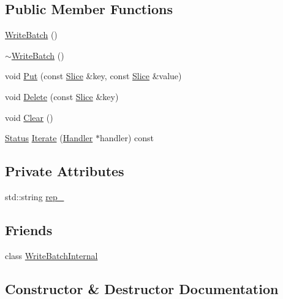 \subsection*{Public Member Functions}
\begin{DoxyCompactItemize}
\item 
\hyperlink{classleveldb_1_1_write_batch_a5287eda973cfd100149a034c871dcc44}{Write\+Batch} ()
\item 
\hyperlink{classleveldb_1_1_write_batch_a5bc7decc31279f2457839b30ad8daca5}{$\sim$\+Write\+Batch} ()
\item 
void \hyperlink{classleveldb_1_1_write_batch_a30770379143a7ccb4ede18ddf0e45bf3}{Put} (const \hyperlink{classleveldb_1_1_slice}{Slice} \&key, const \hyperlink{classleveldb_1_1_slice}{Slice} \&value)
\item 
void \hyperlink{classleveldb_1_1_write_batch_a473da7f94483dab253cc36b7b231ce53}{Delete} (const \hyperlink{classleveldb_1_1_slice}{Slice} \&key)
\item 
void \hyperlink{classleveldb_1_1_write_batch_afd5058344dc9be113919a5110129006f}{Clear} ()
\item 
\hyperlink{classleveldb_1_1_status}{Status} \hyperlink{classleveldb_1_1_write_batch_ac6cb5a360bb095f4e9a6e817c4322a9d}{Iterate} (\hyperlink{classleveldb_1_1_write_batch_1_1_handler}{Handler} $\ast$handler) const 
\end{DoxyCompactItemize}
\subsection*{Private Attributes}
\begin{DoxyCompactItemize}
\item 
std\+::string \hyperlink{classleveldb_1_1_write_batch_acb95a84f553a7dfa89f27a0500060837}{rep\+\_\+}
\end{DoxyCompactItemize}
\subsection*{Friends}
\begin{DoxyCompactItemize}
\item 
class \hyperlink{classleveldb_1_1_write_batch_a0c491f15816190f8235ccd1367d5ae5f}{Write\+Batch\+Internal}
\end{DoxyCompactItemize}


\subsection{Constructor \& Destructor Documentation}
\hypertarget{classleveldb_1_1_write_batch_a5287eda973cfd100149a034c871dcc44}{}
